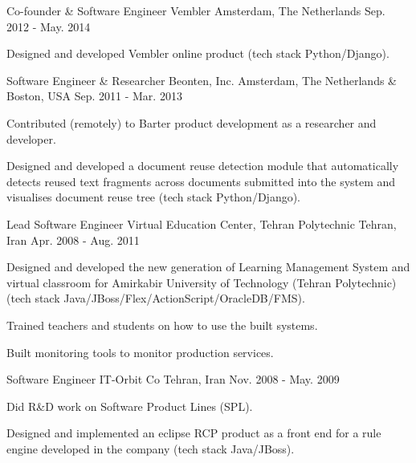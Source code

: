 \begin{cventries}
  \cventry
    {Co-founder \& Software Engineer} %
    {Vembler} %
    {Amsterdam, The Netherlands} %
    {Sep. 2012 - May. 2014} %
    {
      \begin{cvitems} %
        \item {Designed and developed Vembler online product (tech stack Python/Django).}
      \end{cvitems}
    }

  \cventry
    {Software Engineer \& Researcher} %
    {Beonten, Inc.} %
    {Amsterdam, The Netherlands \& Boston, USA} %
    {Sep. 2011 - Mar. 2013} %
    {
      \begin{cvitems} %
        \item {Contributed (remotely) to Barter product development as a researcher and developer.}
        \item {Designed and developed a document reuse detection module that automatically detects reused text fragments across documents submitted into the system and visualises document reuse tree (tech stack Python/Django).}
      \end{cvitems}
    }

  \cventry
    {Lead Software Engineer} %
    {Virtual Education Center, Tehran Polytechnic} %
    {Tehran, Iran} %
    {Apr. 2008 - Aug. 2011} %
    {
      \begin{cvitems} %
        \item {Designed and developed the new generation of Learning Management System and virtual classroom for Amirkabir University of Technology (Tehran Polytechnic) (tech stack Java/JBoss/Flex/ActionScript/OracleDB/FMS).}
        \item {Trained teachers and students on how to use the built systems.}
        \item {Built monitoring tools to monitor production services.}
      \end{cvitems}
    }

  \cventry
    {Software Engineer} %
    {IT-Orbit Co} %
    {Tehran, Iran} %
    {Nov. 2008 - May. 2009} %
    {
      \begin{cvitems} %
        \item {Did R\&D work on Software Product Lines (SPL).}
        \item {Designed and implemented an eclipse RCP product as a front end for a rule engine developed in the company (tech stack Java/JBoss).}
      \end{cvitems}
    }


\end{cventries}
